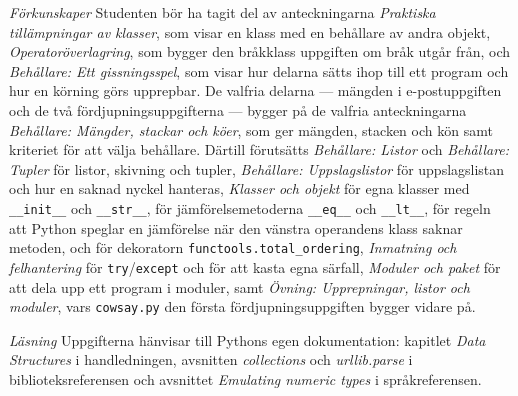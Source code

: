 \emph{Förkunskaper}
Studenten bör ha tagit del av anteckningarna \emph{Praktiska
tillämpningar av klasser}, som visar en klass med en behållare av andra
objekt, \emph{Operatoröverlagring}, som bygger den bråkklass uppgiften
om bråk utgår från, och \emph{Behållare: Ett gissningsspel}, som visar
hur delarna sätts ihop till ett program och hur en körning görs
upprepbar.  De valfria delarna --- mängden i e-postuppgiften och de två
fördjupningsuppgifterna --- bygger på de valfria anteckningarna
\emph{Behållare: Mängder, stackar och köer}, som ger mängden, stacken
och kön samt kriteriet för att välja behållare.  Därtill förutsätts
\emph{Behållare: Listor} och \emph{Behållare: Tupler} för listor,
skivning och tupler, \emph{Behållare: Uppslagslistor} för
uppslagslistan och hur en saknad nyckel hanteras, \emph{Klasser och
objekt} för
egna klasser med \texttt{__init__} och
\texttt{__str__}, för jämförelsemetoderna
\texttt{__eq__} och \texttt{__lt__}, för regeln
att Python speglar en jämförelse när den vänstra operandens klass saknar
metoden, och för dekoratorn
\texttt{functools.total_ordering}, \emph{Inmatning och
felhantering} för
\texttt{try}/\texttt{except} och för att kasta
egna särfall, \emph{Moduler och paket} för att dela upp ett program
i moduler, samt \emph{Övning: Upprepningar, listor och moduler}, vars
\texttt{cowsay.py} den första fördjupningsuppgiften bygger vidare på.

\emph{Läsning}
Uppgifterna hänvisar till Pythons egen dokumentation: kapitlet
\emph{Data Structures} i handledningen, avsnitten \emph{collections}
och \emph{urllib.parse} i biblioteksreferensen och avsnittet
\emph{Emulating numeric types} i språkreferensen.
